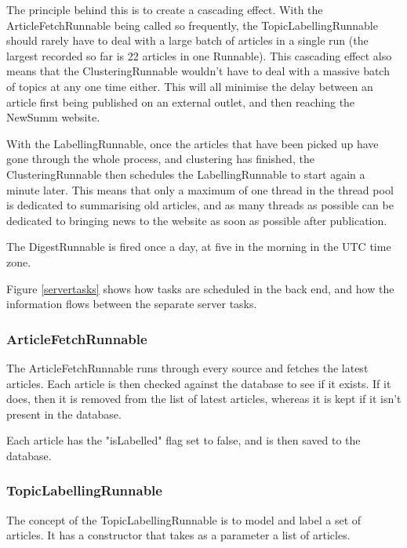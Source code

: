 \documentclass[12pt]{article}
\begin{document}
\begin{sloppypar}
The principle behind this is to create a cascading effect. With the ArticleFetchRunnable being called so frequently, the TopicLabellingRunnable should rarely have to deal with a large batch of articles in a single run (the largest recorded so far is 22 articles in one Runnable). This cascading effect also means that the ClusteringRunnable wouldn't have to deal with a massive batch of topics at any one time either. This will all minimise the delay between an article first being published on an external outlet, and then reaching the NewSumm website.
\end{sloppypar}

With the LabellingRunnable, once the articles that have been picked up have gone through the whole process, and clustering has finished, the ClusteringRunnable then schedules the LabellingRunnable to start again a minute later. This means that only a maximum of one thread in the thread pool is dedicated to summarising old articles, and as many threads as possible can be dedicated to bringing news to the website as soon as possible after publication.

The DigestRunnable is fired once a day, at five in the morning in the UTC time zone.

Figure \ref{servertasks} shows how tasks are scheduled in the back end, and how the information flows between the separate server tasks.

\subsubsection{ArticleFetchRunnable}

The ArticleFetchRunnable runs through every source and fetches the latest articles. Each article is then checked against the database to see if it exists. If it does, then it is removed from the list of latest articles, whereas it is kept if it isn't present in the database.

Each article has the "isLabelled" flag set to false, and is then saved to the database.

\subsubsection{TopicLabellingRunnable}

The concept of the TopicLabellingRunnable is to model and label a set of articles. It has a constructor that takes as a parameter a list of articles. 
\end{document}
